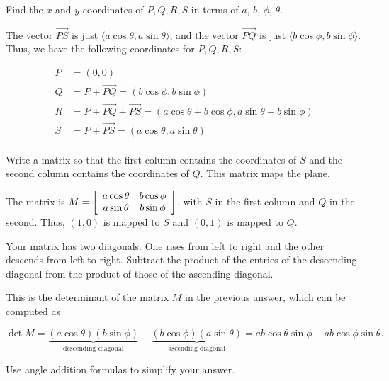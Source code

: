 \documentclass[../key.tex]{subfiles}
\begin{document}
\begin{inner_problem}
\item Find the $x$ and $y$ coordinates of $P,Q,R,S$ in terms of $a$, $b$, $\phi$, $\theta$.
\end{inner_problem}

The vector $\overrightarrow{PS}$ is just $\langle a\cos \theta, a\sin\theta \rangle$, and the vector $\overrightarrow{PQ}$ is just $\langle b\cos\phi, b\sin\phi \rangle$. Thus, we have the following coordinates for $P,Q,R,S$:

\begin{align*}
    P &= (0,0) \\
    Q &= P+\overrightarrow{PQ} = (b\cos\phi, b\sin\phi) \\
    R &= P+\overrightarrow{PQ}+\overrightarrow{PS} = (a\cos\theta + b\cos\phi, a\sin\theta + b\sin\phi) \\
    S &= P+\overrightarrow{PS} = (a\cos\theta, a\sin\theta) \\
\end{align*}

\begin{inner_problem}
\item Write a matrix so that the first column contains the coordinates of $S$ and the second column contains the coordinates of $Q$. This matrix maps the plane.
\end{inner_problem}

The matrix is $M=\left[\begin{array}{cc} a\cos\theta & b\cos\phi \\ a\sin\theta & b\sin\phi \end{array}\right]$, with $S$ in the first column and $Q$ in the second. Thus, $(1,0)$ is mapped to $S$ and $(0,1)$ is mapped to $Q$.

\begin{inner_problem}
\item Your matrix has two diagonals. One rises from left to right and the other descends from left to right. Subtract the product of the entries of the descending diagonal from the product of those of the ascending diagonal.
\end{inner_problem}

This is the determinant of the matrix $M$ in the previous answer, which can be computed as

$$\operatorname{det} M = \underbrace{(a\cos\theta)(b\sin\phi)}_{\text{descending diagonal}} - \underbrace{(b\cos\phi)(a\sin\theta)}_{\text{ascending diagonal}} = ab\cos\theta\sin\phi - ab\cos\phi\sin\theta.$$

\begin{inner_problem}
\item Use angle addition formulas to simplify your answer.
\end{inner_problem}
\end{document}
